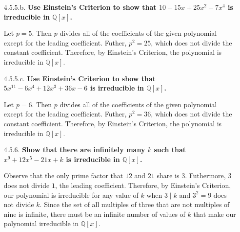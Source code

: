 \documentclass{article}
\begin{document}
\begin{enumerate}
		\item [4.5.5.b.] \textbf{Use Einstein's Criterion to show that $10 - 15x + 25x^2 - 7x^4$ is 
								 irreducible in $\mathbb{Q}[x]$.}

			Let $p = 5$. Then $p$ divides all of the coefficients of the given polynomial except for
			the leading coefficient. Futher, $p^2 = 25$, which does not divide the constant 
			coefficient. Therefore, by Einstein's Criterion, the polynomial is irreducible in 
			$\mathbb{Q}[x]$.

		\item [4.5.5.c.] \textbf{Use Einstein's Criterion to show that $5x^11 - 6x^4 + 12x^3 + 36x 
								 - 6$ is irreducible in $\mathbb{Q}[x]$.}

			Let $p = 6$. Then $p$ divides all of the coefficients of the given polynomial except for
			the leading coefficient. Futher, $p^2 = 36$, which does not divide the constant 
			coefficient. Therefore, by Einstein's Criterion, the polynomial is irreducible in 
			$\mathbb{Q}[x]$.

		\item [4.5.6.] \textbf{Show that there are infinitely many $k$ such that $x^9 + 12x^5 
							   - 21x + k$ is irreducible in $\mathbb{Q}[x]$.}

			Observe that the only prime factor that $12$ and $21$ share is $3$. Futhermore, $3$ does
			not divide $1$, the leading coefficient. Therefore, by Einstein's Criterion, our 
			polynomial is irreducible for any value of $k$ when $3 \mid k$ and $3^2 = 9$ does not 
			divide $k$. Since the set of all multiples of three that are not multiples of nine is
			infinite, there must be an infinite number of values of $k$ that make our polynomial 
			irreducible in $\mathbb{Q}[x]$.

	\end{enumerate}
\end{document}
